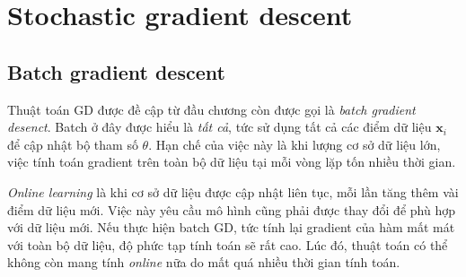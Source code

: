 \section{Stochastic gradient descent}




\subsection{Batch gradient descent }
Thuật toán GD được đề cập từ đầu chương còn được gọi là \textit{batch gradient
desenct}. Batch ở đây được hiểu là \textit{tất cả}, tức sử dụng {tất cả} các điểm dữ liệu $\mathbf{x}_i$ để cập nhật bộ tham số $\theta$. Hạn chế của
việc này là khi lượng cơ sở dữ liệu lớn, việc tính toán gradient trên toàn bộ dữ
liệu tại mỗi vòng lặp tốn nhiều thời gian.


\textit{Online learning} là khi cơ sở dữ liệu được cập nhật liên tục, mỗi lần
tăng thêm vài điểm dữ liệu mới. Việc này yêu cầu mô
hình cũng phải được thay đổi để phù hợp với dữ liệu mới. Nếu thực hiện
batch GD, tức tính lại gradient của hàm mất mát với toàn bộ dữ liệu, độ
phức tạp tính toán sẽ rất cao. Lúc đó, thuật toán có thể không còn mang tính
\textit{online} nữa do mất quá nhiều thời gian tính toán.

